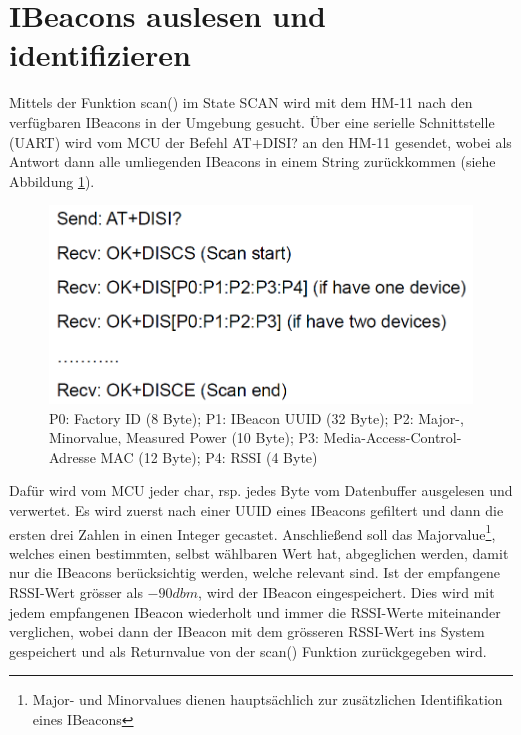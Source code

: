 \section{IBeacons auslesen und identifizieren}
Mittels der Funktion scan() im State SCAN wird mit dem HM-11 nach den verfügbaren IBeacons in der Umgebung gesucht. Über eine serielle Schnittstelle (UART) wird vom MCU der Befehl AT+DISI? an den HM-11 gesendet, wobei als Antwort dann alle umliegenden IBeacons in einem String zurückkommen (siehe Abbildung \ref{fig:disiCommand}).\\
\begin{figure}[h]
\centering
\includegraphics[scale=0.7]{Bilder/disi_command.PNG} 
\caption[Rückgabe des AT+DISI? Befehls]{P0: Factory ID (8 Byte); P1: IBeacon UUID (32 Byte); P2: Major-, Minorvalue, Measured Power (10 Byte); P3: Media-Access-Control-Adresse MAC (12 Byte); P4: RSSI (4 Byte) \cite{hm11Datasheet}}
\label{fig:disiCommand}
\end{figure}
Dafür wird vom MCU jeder char, rsp. jedes Byte vom Datenbuffer ausgelesen und verwertet. Es wird zuerst nach einer UUID eines IBeacons gefiltert und dann die ersten drei Zahlen in einen Integer gecastet. Anschließend soll das Majorvalue\footnote{Major- und Minorvalues dienen hauptsächlich zur zusätzlichen Identifikation eines IBeacons}, welches einen bestimmten, selbst wählbaren Wert hat, abgeglichen werden, damit nur die IBeacons berücksichtig werden, welche relevant sind. Ist der empfangene RSSI-Wert grösser als $-90dbm$, wird der IBeacon eingespeichert. Dies wird mit jedem empfangenen IBeacon wiederholt und immer die RSSI-Werte miteinander verglichen, wobei dann der IBeacon mit dem grösseren RSSI-Wert ins System gespeichert und als Returnvalue von der scan() Funktion zurückgegeben wird.

